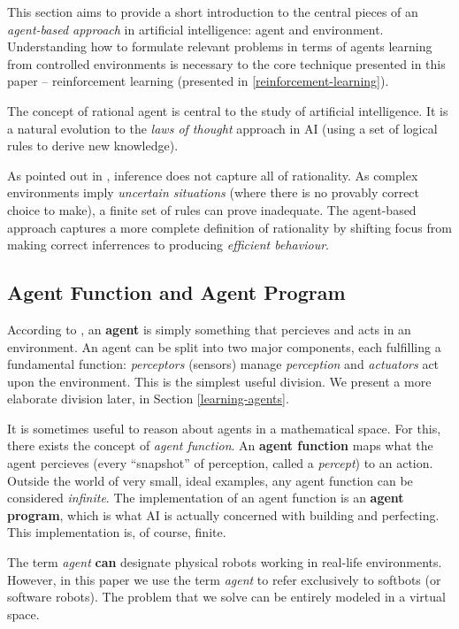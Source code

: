 This section aims to provide a short introduction to the central pieces of an \emph{agent-based approach} in artificial intelligence: agent and environment.
Understanding how to formulate relevant problems in terms of agents learning from controlled environments is necessary to the core technique presented in this paper -- reinforcement learning (presented in \ref{reinforcement-learning}).

The concept of rational agent is central to the study of artificial intelligence. 
It is a natural evolution to the \textit{laws of thought} approach in AI (using a set of logical rules to derive new knowledge).

As pointed out in \cite{aima}, inference does not capture all of rationality.
As complex environments imply \textit{uncertain situations} (where there is no provably correct choice to make), a finite set of rules can prove inadequate.
The agent-based approach captures a more complete definition of rationality by shifting focus from making correct inferrences to producing \emph{efficient behaviour}.

\subsection{Agent Function and Agent Program}
According to \cite{aima}, an \textbf{agent} is simply something that percieves and acts in an environment.
An agent can be split into two major components, each fulfilling a fundamental function:
\emph{perceptors} (sensors) manage \emph{perception} and \emph{actuators} act upon the environment.
This is the simplest useful division. We present a more elaborate division later, in Section \ref{learning-agents}.

It is sometimes useful to reason about agents in a mathematical space.
For this, there exists the concept of \emph{agent function}.
An \textbf{agent function} maps what the agent percieves (every ``snapshot'' of perception, called a \emph{percept}) to an action.
Outside the world of very small, ideal examples, any agent function can be considered \emph{infinite}.
The implementation of an agent function is an \textbf{agent program}, which is what AI is actually concerned with building and perfecting.
This implementation is, of course, finite.

The term \emph{agent} \textbf{can} designate physical robots working in real-life environments.
However, in this paper we use the term \textit{agent} to refer exclusively to softbots (or software robots).
The problem that we solve can be entirely modeled in a virtual space.

